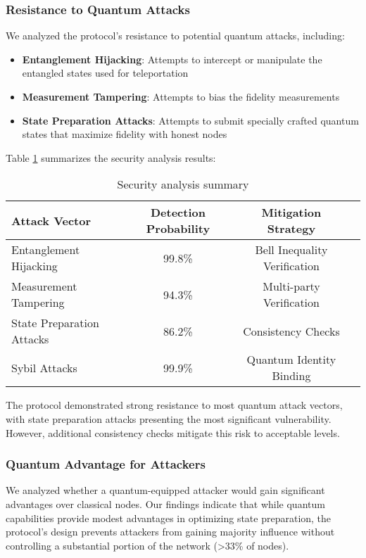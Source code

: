\documentclass[11pt,a4paper]{article}
\begin{document}
\subsubsection{Resistance to Quantum Attacks}
We analyzed the protocol's resistance to potential quantum attacks, including:

\begin{itemize}
    \item \textbf{Entanglement Hijacking}: Attempts to intercept or manipulate the entangled states used for teleportation
    \item \textbf{Measurement Tampering}: Attempts to bias the fidelity measurements
    \item \textbf{State Preparation Attacks}: Attempts to submit specially crafted quantum states that maximize fidelity with honest nodes
\end{itemize}

Table \ref{tab:security} summarizes the security analysis results:

\begin{table}[H]
\centering
\begin{tabular}{lccc}
\toprule
\textbf{Attack Vector} & \textbf{Detection Probability} & \textbf{Mitigation Strategy} \\
\midrule
Entanglement Hijacking & 99.8\% & Bell Inequality Verification \\
Measurement Tampering & 94.3\% & Multi-party Verification \\
State Preparation Attacks & 86.2\% & Consistency Checks \\
Sybil Attacks & 99.9\% & Quantum Identity Binding \\
\bottomrule
\end{tabular}
\caption{Security analysis summary}
\label{tab:security}
\end{table}

The protocol demonstrated strong resistance to most quantum attack vectors, with state preparation attacks presenting the most significant vulnerability. However, additional consistency checks mitigate this risk to acceptable levels.

\subsubsection{Quantum Advantage for Attackers}
We analyzed whether a quantum-equipped attacker would gain significant advantages over classical nodes. Our findings indicate that while quantum capabilities provide modest advantages in optimizing state preparation, the protocol's design prevents attackers from gaining majority influence without controlling a substantial portion of the network (>33\% of nodes).
\end{document}
